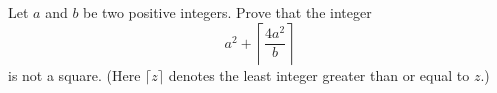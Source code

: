 Let $a$ and $b$ be two positive integers. Prove that the integer
\[a^2+\left\lceil\frac{4a^2}{b}\right\rceil\]
is not a square. (Here $\lceil z\rceil$ denotes the least integer greater than or equal to $z$.)

